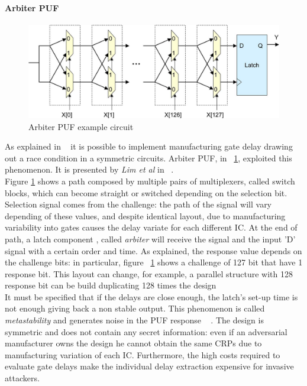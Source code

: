 \documentclass[../tesi.tex]{subfiles}
\begin{document}
\paragraph{Arbiter PUF}\label{par:arbiterpuf}
\begin{figure}
\centering
\includegraphics[scale=0.25]{images/arbiterpuf.png}
\caption{Arbiter PUF example circuit}
\label{fig:arbiterpuf}
\end{figure}
As explained in ~\cite{gassend2002silicon} it is possible to implement manufacturing gate delay drawing out a race condition in a symmetric circuits.  Arbiter PUF, in ~\ref{fig:arbiterpuf}, exploited this phenomenon. It is presented by \textit{Lim et al} in ~\cite{lim2005extracting}.\\
Figure \ref{fig:arbiterpuf} shows a path composed by multiple pairs of multiplexers, called switch blocks, which can become straight or switched depending on the selection bit. 
Selection signal comes from the challenge: the path of the signal will vary depending of these values, and despite identical layout, due to manufacturing variability into gates causes the delay variate for each different IC. 
At the end of path, a latch component , called \textit{arbiter} will receive the signal and the input 'D' signal with a certain order and time. 
As explained, the response value depends on the challenge bits: in particular, figure ~\ref{fig:arbiterpuf} shows a challenge of 127 bit that have 1 response bit. This layout can change, for example, a parallel structure with 128 response bit can be build duplicating 128 times the design\\
It must be specified that if the delays are close enough, the latch's set-up time is not enough giving back a non stable output. This phenomenon is called \textit{metastability} and generates noise in the PUF response ~\cite{maes2010physically} . The design is symmetric and does not contain any secret information: even if an adversarial manufacturer owns the design he cannot obtain the same CRPs due to manufacturing variation of each IC. 
Furthermore, the high costs required to evaluate gate delays make the individual delay extraction expensive for invasive attackers. 
\end{document}
